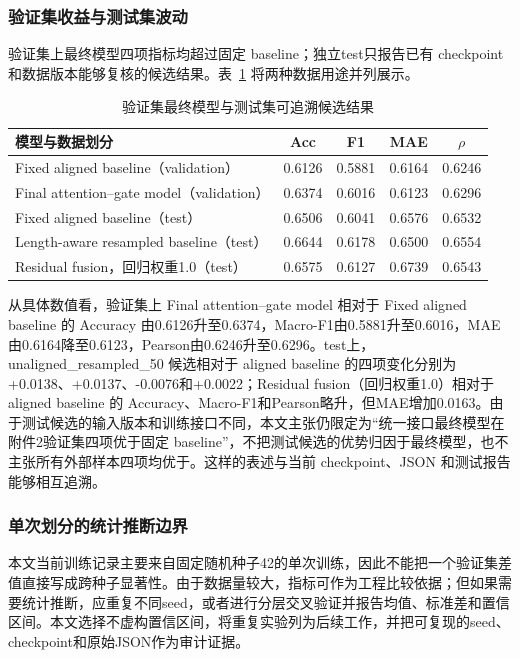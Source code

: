 \documentclass{gmcmthesis}
\begin{document}
\subsubsection{验证集收益与测试集波动}
验证集上最终模型四项指标均超过固定 baseline；独立test只报告已有 checkpoint 和数据版本能够复核的候选结果。表~\ref{tab:test_review} 将两种数据用途并列展示。

\begin{table}[H]
\centering
\caption{验证集最终模型与测试集可追溯候选结果}
\label{tab:test_review}
\begin{tabular}{lcccc}
\toprule
模型与数据划分 & Acc & F1 & MAE & $\rho$ \\
\midrule
Fixed aligned baseline（validation） & 0.6126 & 0.5881 & 0.6164 & 0.6246 \\
Final attention--gate model（validation） & 0.6374 & 0.6016 & 0.6123 & 0.6296 \\
Fixed aligned baseline（test） & 0.6506 & 0.6041 & 0.6576 & 0.6532 \\
Length-aware resampled baseline（test） & 0.6644 & 0.6178 & 0.6500 & 0.6554 \\
Residual fusion，回归权重1.0（test） & 0.6575 & 0.6127 & 0.6739 & 0.6543 \\
\bottomrule
\end{tabular}
\end{table}

\par\indent 从具体数值看，验证集上 Final attention--gate model 相对于 Fixed aligned baseline 的 Accuracy 由0.6126升至0.6374，Macro-F1由0.5881升至0.6016，MAE由0.6164降至0.6123，Pearson由0.6246升至0.6296。test上，unaligned\_resampled\_50 候选相对于 aligned baseline 的四项变化分别为+0.0138、+0.0137、-0.0076和+0.0022；Residual fusion（回归权重1.0）相对于 aligned baseline 的 Accuracy、Macro-F1和Pearson略升，但MAE增加0.0163。由于测试候选的输入版本和训练接口不同，本文主张仍限定为“统一接口最终模型在附件2验证集四项优于固定 baseline”，不把测试候选的优势归因于最终模型，也不主张所有外部样本四项均优于。这样的表述与当前 checkpoint、JSON 和测试报告能够相互追溯。

\subsubsection{单次划分的统计推断边界}
本文当前训练记录主要来自固定随机种子42的单次训练，因此不能把一个验证集差值直接写成跨种子显著性。由于数据量较大，指标可作为工程比较依据；但如果需要统计推断，应重复不同seed，或者进行分层交叉验证并报告均值、标准差和置信区间。本文选择不虚构置信区间，将重复实验列为后续工作，并把可复现的seed、checkpoint和原始JSON作为审计证据。
\end{document}
